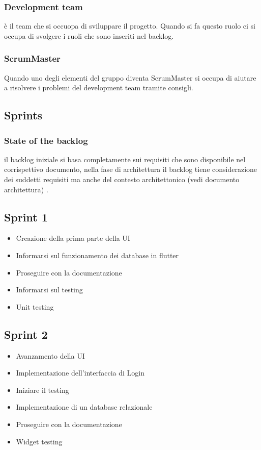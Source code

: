 \documentclass{article}
\begin{document}
\subsubsection{Development team} è il team che si occuopa di sviluppare il progetto. Quando si fa questo ruolo
ci si occupa di svolgere i ruoli che sono inseriti nel backlog.
\subsubsection{ScrumMaster} Quando uno degli elementi del gruppo diventa ScrumMaster
si occupa di aiutare a risolvere i problemi del development team tramite consigli.


\subsection{Sprints} 
\subsubsection{State of the backlog}
il backlog iniziale si basa completamente sui requisiti che sono disponibile nel corrispettivo documento, nella fase di architettura il backlog tiene considerazione dei suddetti requisiti ma anche del contesto architettonico (vedi documento architettura) . 
\subsection{Sprint 1}
\begin{itemize}
    \item Creazione della prima parte della UI
    \item Informarsi sul funzionamento dei database in flutter
    \item Proseguire con la documentazione
    \item Informarsi sul testing
    \item Unit testing
\end{itemize}
\subsection{Sprint 2}
\begin{itemize}
    \item Avanzamento della UI
    \item Implementazione dell'interfaccia di Login
    \item Iniziare il testing
    \item Implementazione di un database relazionale
    \item Proseguire con la documentazione
    \item Widget testing
\end{itemize}
\end{document}
